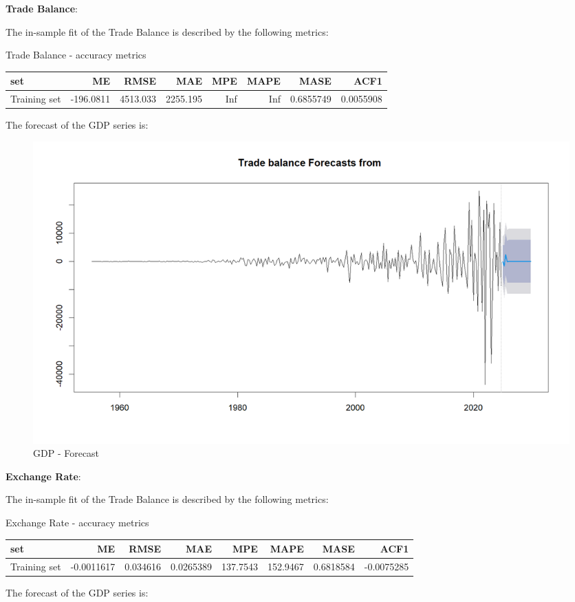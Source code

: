\documentclass[
]{article}
\begin{document}
\textbf{Trade Balance}:

The in-sample fit of the Trade Balance is described by the following
metrics:

\bgroup \table[H]
\centering
\caption{\label{tab:unnamed-chunk-17}Trade Balance - accuracy metrics}
\centering
\begin{tabular}[t]{lrrrrrrr}
\toprule
set & ME & RMSE & MAE & MPE & MAPE & MASE & ACF1\\
\midrule
Training set & -196.0811 & 4513.033 & 2255.195 & Inf & Inf & 0.6855749 & 0.0055908\\
\bottomrule
\end{tabular}
\endtable\egroup

The forecast of the GDP series is:

\begin{figure}

{\centering \includegraphics[width=0.8\linewidth]{../results/Trade Balance_forecast} 

}

\caption{GDP - Forecast}\label{fig:unnamed-chunk-18}
\end{figure}

\textbf{Exchange Rate}:

The in-sample fit of the Trade Balance is described by the following
metrics:

\bgroup \table[H]
\centering
\caption{\label{tab:unnamed-chunk-19}Exchange Rate - accuracy metrics}
\centering
\begin{tabular}[t]{lrrrrrrr}
\toprule
set & ME & RMSE & MAE & MPE & MAPE & MASE & ACF1\\
\midrule
Training set & -0.0011617 & 0.034616 & 0.0265389 & 137.7543 & 152.9467 & 0.6818584 & -0.0075285\\
\bottomrule
\end{tabular}
\endtable\egroup

The forecast of the GDP series is:
\end{document}
